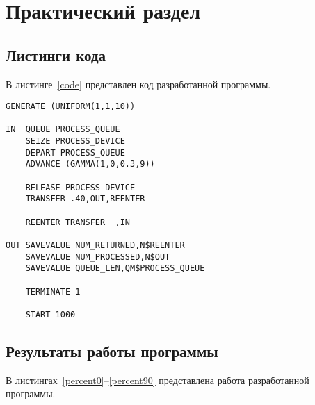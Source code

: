 \chapter{Практический раздел}

\section{Листинги кода}

В листинге~\ref{code} представлен код разработанной программы.

\begin{lstlisting}[label=code,caption=Код программы на языке GPSS]
    GENERATE (UNIFORM(1,1,10))

IN 	QUEUE PROCESS_QUEUE
    SEIZE PROCESS_DEVICE
    DEPART PROCESS_QUEUE
    ADVANCE (GAMMA(1,0,0.3,9))

    RELEASE PROCESS_DEVICE
    TRANSFER .40,OUT,REENTER

    REENTER TRANSFER  ,IN

OUT SAVEVALUE NUM_RETURNED,N$REENTER 
    SAVEVALUE NUM_PROCESSED,N$OUT
    SAVEVALUE QUEUE_LEN,QM$PROCESS_QUEUE

    TERMINATE 1

    START 1000
\end{lstlisting}

\section{Результаты работы программы}

В листингах~\ref{percent0}--\ref{percent90} представлена работа разработанной программы.

